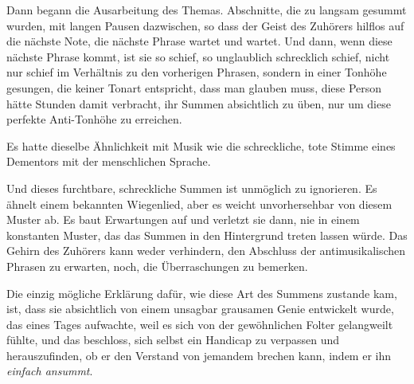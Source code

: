 Dann begann die Ausarbeitung des Themas. Abschnitte, die zu langsam gesummt wurden, mit langen Pausen dazwischen, so dass der Geist des Zuhörers hilflos auf die nächste Note, die nächste Phrase wartet und wartet. Und dann, wenn diese nächste Phrase kommt, ist sie so schief, so unglaublich schrecklich schief, nicht nur schief im Verhältnis zu den vorherigen Phrasen, sondern in einer Tonhöhe gesungen, die keiner Tonart entspricht, dass man glauben muss, diese Person hätte Stunden damit verbracht, ihr Summen absichtlich zu üben, nur um diese perfekte Anti-Tonhöhe zu erreichen.

Es hatte dieselbe Ähnlichkeit mit Musik wie die schreckliche, tote Stimme eines Dementors mit der menschlichen Sprache.

Und dieses furchtbare, schreckliche Summen ist unmöglich zu ignorieren. Es ähnelt einem bekannten Wiegenlied, aber es weicht unvorhersehbar von diesem Muster ab. Es baut Erwartungen auf und verletzt sie dann, nie in einem konstanten Muster, das das Summen in den Hintergrund treten lassen würde. Das Gehirn des Zuhörers kann weder verhindern, den Abschluss der antimusikalischen Phrasen zu erwarten, noch, die Überraschungen zu bemerken.

Die einzig mögliche Erklärung dafür, wie diese Art des Summens zustande kam, ist, dass sie absichtlich von einem unsagbar grausamen Genie entwickelt wurde, das eines Tages aufwachte, weil es sich von der gewöhnlichen Folter gelangweilt fühlte, und das beschloss, sich selbst ein Handicap zu verpassen und herauszufinden, ob er den Verstand von jemandem brechen kann, indem er ihn \emph{einfach ansummt}.

